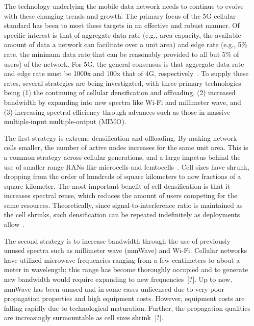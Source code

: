 \documentclass[12pt,dvipsnames]{report}
\begin{document}
The technology underlying the mobile data network needs to continue to evolve with these changing trends and growth.  The primary focus of the 5G cellular standard has been to meet these targets in an effective and robust manner.  Of specific interest is that of aggregate data rate (e.g., area capacity, the available amount of data a network can facilitate over a unit area) and edge rate (e.g., 5\% rate, the minimum data rate that can be reasonably provided to all but 5\% of users) of the network.  For 5G, the general consensus is that aggregate data rate and edge rate must be 1000x and 100x that of 4G, respectively~\cite{6824752}.  To supply these rates, several strategies are being investigated, with three primary technologies being (1) the continuing of cellular densification and offloading, (2) increased bandwidth by expanding into new spectra like Wi-Fi and millimeter wave, and (3) increasing spectral efficiency through advances such as those in massive multiple-input multiple-output (MIMO).

The first strategy is extreme densification and offloading.  By making network cells smaller, the number of active nodes increases for the same unit area.  This is a common strategy across cellular generations, and a large impetus behind the use of smaller range RANs like microcells and femtocells~\cite{4623708}.  Cell sizes have shrunk, dropping from the order of hundreds of square kilometers to now fractions of a square kilometer.  The most important benefit of cell densification is that it increases spectral reuse, which reduces the amount of users competing for the same resources.  Theoretically, since signal-to-interference ratio is maintained as the cell shrinks, such densification can be repeated indefinitely as deployments allow~\cite{6824752, 6171996}.

The second strategy is to increase bandwidth through the use of previously unused spectra such as millimeter wave (mmWave) and Wi-Fi.  Cellular networks have utilized microwave frequencies ranging from a few centimeters to about a meter in wavelength; this range has become thoroughly occupied and to generate new bandwidth would require expanding to new frequencies~[?].  Up to now, mmWave has been unused and in some cases unlicensed due to very poor propagation properties and high equipment costs.  However, equipment costs are falling rapidly due to technological maturation.  Further, the propagation qualities are increasingly surmountable as cell sizes shrink~[?].
\end{document}
